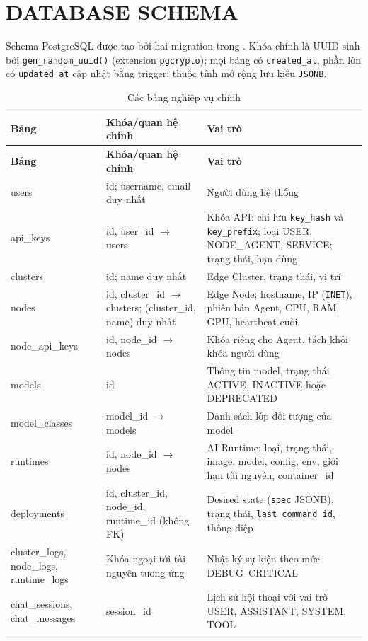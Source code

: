\chapter{DATABASE SCHEMA}

Schema PostgreSQL được tạo bởi hai migration trong . Khóa
chính là UUID sinh bởi \texttt{gen\_random\_uuid()} (extension \texttt{pgcrypto});
mọi bảng có \texttt{created\_at}, phần lớn có \texttt{updated\_at} cập nhật bằng
trigger; thuộc tính mở rộng lưu kiểu \texttt{JSONB}.

\begin{longtable}{L{3.3cm}L{5cm}L{6.2cm}}
\caption{Các bảng nghiệp vụ chính}\label{tab:database-schema}\\
\toprule
\textbf{Bảng} & \textbf{Khóa/quan hệ chính} & \textbf{Vai trò}\\
\midrule\endfirsthead
\toprule
\textbf{Bảng} & \textbf{Khóa/quan hệ chính} & \textbf{Vai trò}\\
\midrule\endhead
users & id; username, email duy nhất & Người dùng hệ thống\\
api\_keys & id, user\_id $\rightarrow$ users & Khóa API: chỉ lưu \texttt{key\_hash} và \texttt{key\_prefix}; loại USER, NODE\_AGENT, SERVICE; trạng thái, hạn dùng\\
clusters & id; name duy nhất & Edge Cluster, trạng thái, vị trí\\
nodes & id, cluster\_id $\rightarrow$ clusters; (cluster\_id, name) duy nhất & Edge Node: hostname, IP (\texttt{INET}), phiên bản Agent, CPU, RAM, GPU, heartbeat cuối\\
node\_api\_keys & id, node\_id $\rightarrow$ nodes & Khóa riêng cho Agent, tách khỏi khóa người dùng\\
models & id & Thông tin model, trạng thái ACTIVE, INACTIVE hoặc DEPRECATED\\
model\_classes & model\_id $\rightarrow$ models & Danh sách lớp đối tượng của model\\
runtimes & id, node\_id $\rightarrow$ nodes & AI Runtime: loại, trạng thái, image, model, config, env, giới hạn tài nguyên, container\_id\\
deployments & id, cluster\_id, node\_id, runtime\_id (không FK) & Desired state (\texttt{spec} JSONB), trạng thái, \texttt{last\_command\_id}, thông điệp\\
cluster\_logs, node\_logs, runtime\_logs & Khóa ngoại tới tài nguyên tương ứng & Nhật ký sự kiện theo mức DEBUG--CRITICAL\\
chat\_sessions, chat\_messages & session\_id & Lịch sử hội thoại với vai trò USER, ASSISTANT, SYSTEM, TOOL\\
\bottomrule
\end{longtable}

